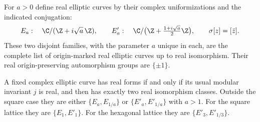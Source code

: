 \begin{theorem}\label{A7-real-classification}
For $a>0$ define real elliptic curves by their complex uniformizations and the indicated conjugation:
\[
 E_a:\quad \C/(\Z+i\sqrt a\,\Z),\qquad
 E'_a:\quad \C/\bigl(\Z+\tfrac{1+i\sqrt a}{2}\Z\bigr),
 \qquad \sigma[z]=[\bar{z}].
\]
These two disjoint families, with the parameter $a$ unique in each, are the complete list of origin-marked real elliptic curves up to real isomorphism. Their real origin-preserving automorphism groups are $\{\pm1\}$.

A fixed complex elliptic curve has real forms if and only if its usual modular invariant $j$ is real, and then has exactly two real isomorphism classes. Outside the square case they are either $\{E_a,E_{1/a}\}$ or $\{E'_a,E'_{1/a}\}$ with $a>1$. For the square lattice they are $\{E_1,E'_1\}$. For the hexagonal lattice they are $\{E'_3,E'_{1/3}\}$.
\end{theorem}
